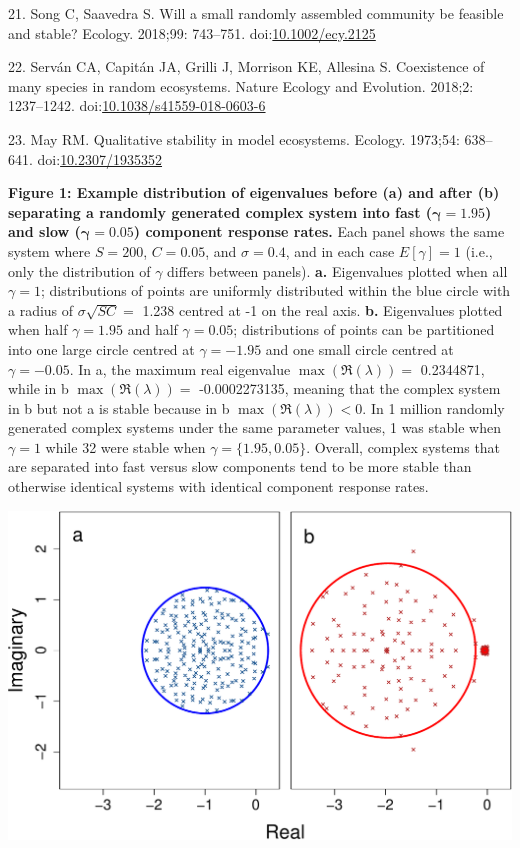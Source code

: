 \documentclass[]{article}
\begin{document}
\hypertarget{ref-Song2018}{}
21. Song C, Saavedra S. Will a small randomly assembled community be
feasible and stable? Ecology. 2018;99: 743--751.
doi:\href{https://doi.org/10.1002/ecy.2125}{10.1002/ecy.2125}

\hypertarget{ref-Servan2018}{}
22. Serván CA, Capitán JA, Grilli J, Morrison KE, Allesina S.
Coexistence of many species in random ecosystems. Nature Ecology and
Evolution. 2018;2: 1237--1242.
doi:\href{https://doi.org/10.1038/s41559-018-0603-6}{10.1038/s41559-018-0603-6}

\hypertarget{ref-May1973}{}
23. May RM. Qualitative stability in model ecosystems. Ecology. 1973;54:
638--641. doi:\href{https://doi.org/10.2307/1935352}{10.2307/1935352}

\clearpage

\textbf{Figure 1: Example distribution of eigenvalues before (a) and
after (b) separating a randomly generated complex system into fast
(\(\boldsymbol{\gamma} = 1.95\)) and slow
(\(\boldsymbol{\gamma} = 0.05\)) component response rates.} Each panel
shows the same system where \(S = 200\), \(C = 0.05\), and
\(\sigma = 0.4\), and in each case \(E[\gamma] = 1\) (i.e., only the
distribution of \(\gamma\) differs between panels). \textbf{a.}
Eigenvalues plotted when all \(\gamma = 1\); distributions of points are
uniformly distributed within the blue circle with a radius of
\(\sigma\sqrt{SC} =\) 1.238 centred at -1 on the real axis. \textbf{b.}
Eigenvalues plotted when half \(\gamma = 1.95\) and half
\(\gamma = 0.05\); distributions of points can be partitioned into one
large circle centred at \(\gamma = -1.95\) and one small circle centred
at \(\gamma = -0.05\). In a, the maximum real eigenvalue
\(\max\left(\Re(\lambda)\right) =\) 0.2344871, while in b
\(\max\left(\Re(\lambda)\right) =\) -0.0002273135, meaning that the
complex system in b but not a is stable because in b
\(\max\left(\Re(\lambda)\right) < 0\). In 1 million randomly generated
complex systems under the same parameter values, 1 was stable when
\(\gamma = 1\) while 32 were stable when \(\gamma = \{1.95, 0.05\}\).
Overall, complex systems that are separated into fast versus slow
components tend to be more stable than otherwise identical systems with
identical component response rates.

\includegraphics{ms_files/figure-latex/unnamed-chunk-10-1.pdf}
\end{document}
